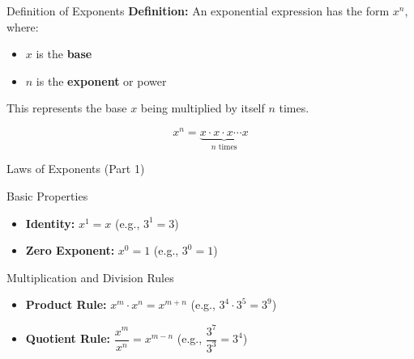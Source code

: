 \documentclass{beamer}
\begin{document}
\begin{frame}{Definition of Exponents}
\textbf{Definition:} An exponential expression has the form $x^n$, where:
\begin{itemize}
    \item $x$ is the \textbf{base}
    \item $n$ is the \textbf{exponent} or power
\end{itemize}

\vspace{0.3cm}
This represents the base $x$ being multiplied by itself $n$ times.

\[
x^n = \underbrace{x \cdot x \cdot x \cdots x}_{n \text{ times}}
\]
\end{frame}

\begin{frame}{Laws of Exponents (Part 1)}

\begin{block}{Basic Properties}

\begin{itemize}
    \item \textbf{Identity:} \quad $x^1 = x$ \hfill (e.g., $3^1 = 3$)
    \item \textbf{Zero Exponent:} \quad $x^0 = 1$ \hfill (e.g., $3^0 = 1$)
\end{itemize}
\end{block}

\begin{block}{Multiplication and Division Rules}
\vspace{0.2cm}
\begin{itemize}
    \item \textbf{Product Rule:} \quad $x^m \cdot x^n = x^{m+n}$ \hfill (e.g., $3^4 \cdot 3^5 = 3^9$)
    \item \textbf{Quotient Rule:} \quad $\dfrac{x^m}{x^n} = x^{m-n}$ \hfill (e.g., $\dfrac{3^7}{3^3} = 3^4$)
\end{itemize}
\end{block}

\end{frame}
\end{document}
